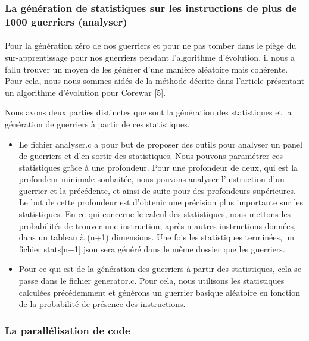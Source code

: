 \documentclass[french]{article}
\begin{document}
        \subsubsection{La génération de statistiques sur les instructions de plus de 1000 guerriers (analyser)}
            \paragraph{} Pour la génération zéro de nos guerriers et pour ne pas tomber dans le piège du sur-apprentissage pour nos guerriers pendant l'algorithme d'évolution, il nous a fallu trouver un moyen de les générer d'une manière aléatoire mais cohérente. Pour cela, nous nous sommes aidés de la méthode décrite dans l'article présentant un algorithme d'évolution pour Corewar [5]. 
            \bigskip
            
            Nous avons deux parties distinctes que sont la génération des statistiques et la génération de guerriers à partir de ces statistiques.
            \begin{itemize}
                \item Le fichier analyser.c a pour but de proposer des outils pour analyser un panel de guerriers et d'en sortir des statistiques. Nous pouvons paramétrer ces statistiques grâce à une profondeur. Pour une profondeur de deux, qui est la profondeur minimale souhaitée, nous pouvons analyser l'instruction d'un guerrier et la précédente, et ainsi de suite pour des profondeurs supérieures. Le but de cette profondeur est d'obtenir une précision plus importante sur les statistiques. En ce qui concerne le calcul des statistiques, nous mettons les probabilités de trouver une instruction, après n autres instructions données, dans un tableau à (n+1) dimensions. Une fois les  statistiques terminées, un fichier stats[n+1].json sera généré dans le même dossier que les guerriers.
                \item Pour ce qui est de la génération des guerriers à partir des statistiques, cela se passe dans le fichier generator.c. Pour cela, nous   utilisons les statistiques calculées précédemment et générons un guerrier basique 
                aléatoire en fonction de la probabilité de présence des instructions.
            \end{itemize} 
        
        \subsubsection{La parallélisation de code}
\end{document}
